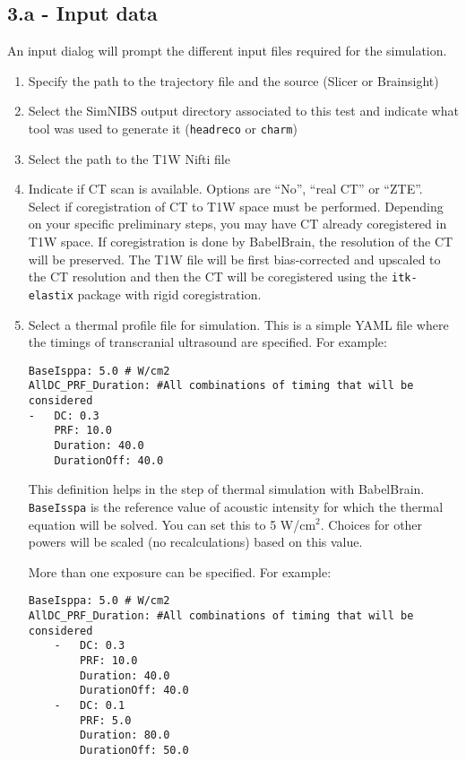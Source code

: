 \hypertarget{a---input-data}{%
\subsection{3.a - Input data}\label{a---input-data}}

An input dialog will prompt the different input files required for the
simulation.

\begin{enumerate}
\def\labelenumi{\arabic{enumi}.}
\item
  Specify the path to the trajectory file and the source (Slicer or
  Brainsight)
\item
  Select the SimNIBS output directory associated to this test and
  indicate what tool was used to generate it (\texttt{headreco} or
  \texttt{charm})
\item
  Select the path to the T1W Nifti file
\item
  Indicate if CT scan is available. Options are ``No'', ``real CT'' or
  ``ZTE''. Select if coregistration of CT to T1W space must be
  performed. Depending on your specific preliminary steps, you may have
  CT already coregistered in T1W space. If coregistration is done by
  BabelBrain, the resolution of the CT will be preserved. The T1W file
  will be first bias-corrected and upscaled to the CT resolution and
  then the CT will be coregistered using the \texttt{itk-elastix}
  package with rigid coregistration.
\item
  Select a thermal profile file for simulation. This is a simple YAML
  file where the timings of transcranial ultrasound are specified. For
  example:

\begin{verbatim}
BaseIsppa: 5.0 # W/cm2
AllDC_PRF_Duration: #All combinations of timing that will be considered
-   DC: 0.3
    PRF: 10.0
    Duration: 40.0
    DurationOff: 40.0
\end{verbatim}

  This definition helps in the step of thermal simulation with
  BabelBrain. \texttt{BaseIsspa} is the reference value of acoustic
  intensity for which the thermal equation will be solved. You can set
  this to 5 W/cm\(^2\). Choices for other powers will be scaled (no
  recalculations) based on this value.

  More than one exposure can be specified. For example:

\begin{verbatim}
BaseIsppa: 5.0 # W/cm2
AllDC_PRF_Duration: #All combinations of timing that will be considered
    -   DC: 0.3
        PRF: 10.0
        Duration: 40.0
        DurationOff: 40.0
    -   DC: 0.1
        PRF: 5.0
        Duration: 80.0
        DurationOff: 50.0
\end{verbatim}


\end{enumerate}
